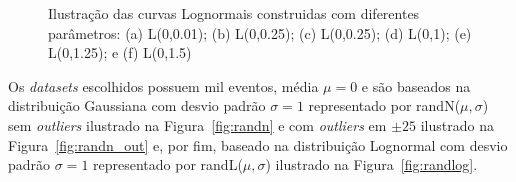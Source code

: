\begin{figure}[H]
\begin{subfigure}[b]{0.3\textwidth}
		\caption{}
		\label{fig:sig150}
	\end{subfigure}
	
	\caption{Ilustração das curvas Lognormais construidas com diferentes parâmetros: (a) L(0,0.01); (b) L(0,0.25); (c) L(0,0.25); (d) L(0,1); (e) L(0,1.25); e (f) L(0,1.5)}
	\label{fig:Lognormal}
\end{figure}

Os \textit{datasets} escolhidos possuem mil eventos, média $ \mu = 0 $ e são baseados na distribuição Gaussiana com desvio padrão $ \sigma = 1 $ representado por randN($ \mu,\sigma $) sem \textit{outliers} ilustrado na Figura~\ref{fig:randn} e com \textit{outliers} em $ \pm 25 $ ilustrado  na Figura~\ref{fig:randn_out} e, por fim, baseado na distribuição Lognormal com desvio padrão $ \sigma = 1 $ representado por randL($ \mu,\sigma $) ilustrado na Figura~\ref{fig:randlog}.

